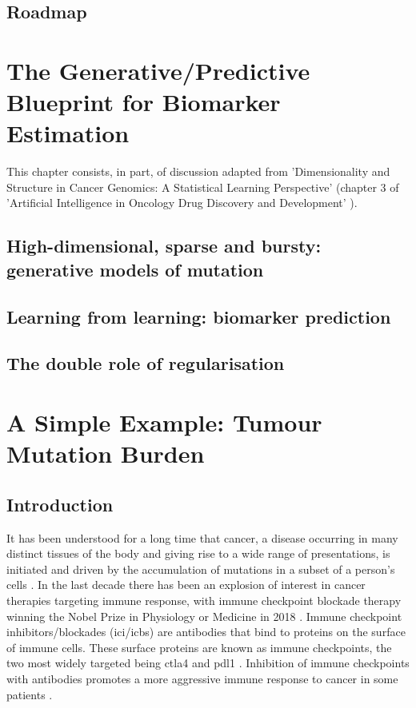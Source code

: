 \documentclass[10pt,twoside,openright]{report}
\begin{document}
\section{Roadmap}

\chapter{The Generative/Predictive Blueprint for Biomarker Estimation}
This chapter consists, in part, of discussion adapted from 'Dimensionality and Structure in Cancer Genomics: A Statistical Learning Perspective' \citep{bradley_dimensionality_2020} (chapter 3 of 'Artificial Intelligence in Oncology Drug Discovery and Development' \citep{cassidy_artificial_2020}).

\section{High-dimensional, sparse and bursty: generative models of mutation}
\section{Learning from learning: biomarker prediction}
\section{The double role of regularisation}

\chapter{A Simple Example: Tumour Mutation Burden}
\section{Introduction}
It has been understood for a long time that cancer, a disease occurring in many distinct tissues of the body and giving rise to a wide range of presentations, is initiated and driven by the accumulation of mutations in a subset of a person's cells \citep{boveri_concerning_2008}. In the last decade there has been an explosion of interest in cancer therapies targeting immune response, with immune checkpoint blockade therapy winning the Nobel Prize in Physiology or Medicine in 2018 \citep{ledford_cancer_2018}. Immune checkpoint inhibitors/blockades (\acrshort{ici}/\acrshort{icb}s) are antibodies that bind to proteins on the surface of immune cells. These surface proteins are known as immune checkpoints, the two most widely targeted being \acrfull{ctla4} and \acrfull{pdl1} \citep{buchbinder_ctla-4_2016}. Inhibition of immune checkpoints with antibodies promotes a more aggressive immune response to cancer in some patients \citep{pardoll_blockade_2012}.
\end{document}
